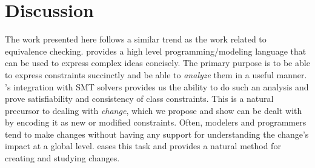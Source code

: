 \section{Discussion}
\label{sec:discussion}

The work presented here follows a similar trend as the work related to
equivalence checking. \Klang{} provides a high level
programming/modeling language that can be used to express complex
ideas concisely. The primary purpose is to be able to express
constraints succinctly and be able to \emph{analyze} them in a useful
manner. \Klang's integration with SMT solvers provides us the ability
to do such an analysis and prove satisfiability and consistency of
class constraints. This is a natural precursor to dealing with
\emph{change}, which we propose and show can be dealt with by encoding
it as new or modified constraints. Often, modelers and programmers
tend to make changes without having any support for understanding the
change's impact at a global level. \Klang{} eases this task and
provides a natural method for creating and studying
changes. 



